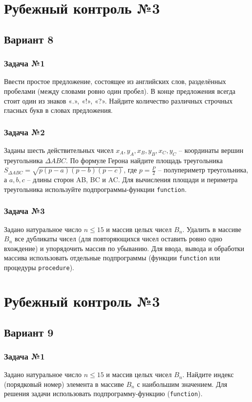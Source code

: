 \documentclass[12pt,a5paper,landscape]{report}
\begin{document}
\section*{Рубежный контроль №3}
\subsection*{Вариант 8}
\subsubsection*{Задача №1}
Ввести простое предложение, состоящее из английских слов, разделённых пробелами (между словами ровно один пробел). В конце предложения всегда стоит один из знаков «.», «!», «?». Найдите количество различных строчных гласных букв в словах предложения.
\subsubsection*{Задача №2}
Заданы шесть действительных чисел $x_A, y_A, x_B, y_B, x_C, y_C$ -- координаты вершин треугольника $\Delta ABC$. По формуле Герона найдите площадь треугольника $S_{\Delta ABC} = \sqrt { p (p-a) (p-b) (p-c)}$, где $p = \frac{P}{2}$ -- полупериметр треугольника, а $a,b,c$ -- длины сторон AB, BC и AC. Для вычисления площади и периметра треугольника используйте подпрограммы-функции \texttt{function}.
\subsubsection*{Задача №3}
Задано натуральное число $n \le 15$ и массив целых чисел $B_n$. Удалить в массиве $B_n$ все дубликаты чисел (для повторяющихся чисел оставить ровно одно вхождение) и упорядочить массив по убыванию. Для ввода, вывода и обработки массива использовать отдельные подпрограммы (функции \texttt{function} или процедуры \texttt{procedure}).

\section*{Рубежный контроль №3}
\subsection*{Вариант 9}
\subsubsection*{Задача №1}
Задано натуральное число $n \le 15$ и массив целых чисел $B_n$. Найдите индекс (порядковый номер) элемента в массиве $B_n$ с наибольшим значением. Для решения задачи использовать подпрограмму-функцию (\texttt{function}).
\end{document}
